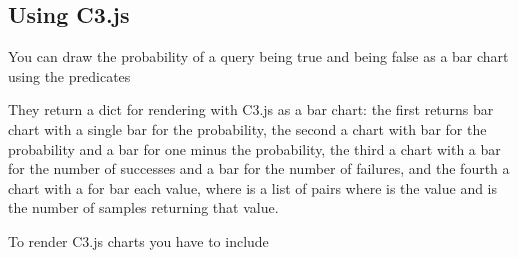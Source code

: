 \documentclass[letterpaper,10pt,english]{sphinxmanual}
\begin{document}
\subsection{Using C3.js}
\label{\detokenize{index:using-c3-js}}
\sphinxAtStartPar
You can draw the probability of a query being true and being false as a bar chart using the predicates

\begin{sphinxVerbatim}[commandchars=\\\{\}]
  
  
  
  
\end{sphinxVerbatim}

\sphinxAtStartPar
They return a dict for rendering with C3.js as a bar chart: the first returns bar chart with a single bar for the probability, the second a chart with bar for the probability and a bar for one minus the probability, the third a chart with a bar for the number of successes and a bar for the number of failures, and the fourth a chart with a for bar each value, where  is a list of pairs  where  is the value and  is the number of samples returning that value.

\sphinxAtStartPar
To render C3.js charts you have to include

\begin{sphinxVerbatim}[commandchars=\\\{\}]
 
\end{sphinxVerbatim}
\end{document}
